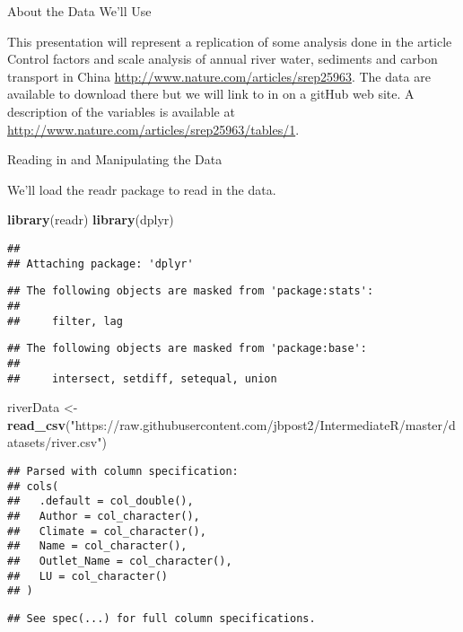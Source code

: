\documentclass[]{article}
\newenvironment{Shaded}{\begin{snugshade}}{\end{snugshade}}
\newcommand{\KeywordTok}[1]{\textcolor[rgb]{0.13,0.29,0.53}{\textbf{#1}}}
\newcommand{\StringTok}[1]{\textcolor[rgb]{0.31,0.60,0.02}{#1}}
\newcommand{\NormalTok}[1]{#1}
\begin{document}
About the Data We'll Use

This presentation will represent a replication of some analysis done in
the article Control factors and scale analysis of annual river water,
sediments and carbon transport in China
\url{http://www.nature.com/articles/srep25963}. The data are available
to download there but we will link to in on a gitHub web site. A
description of the variables is available at
\url{http://www.nature.com/articles/srep25963/tables/1}.

Reading in and Manipulating the Data

We'll load the readr package to read in the data.

\begin{Shaded}
\begin{Highlighting}[]
\KeywordTok{library}\NormalTok{(readr)}
\KeywordTok{library}\NormalTok{(dplyr)}
\end{Highlighting}
\end{Shaded}

\begin{verbatim}
## 
## Attaching package: 'dplyr'
\end{verbatim}

\begin{verbatim}
## The following objects are masked from 'package:stats':
## 
##     filter, lag
\end{verbatim}

\begin{verbatim}
## The following objects are masked from 'package:base':
## 
##     intersect, setdiff, setequal, union
\end{verbatim}

\begin{Shaded}
\begin{Highlighting}[]
\NormalTok{riverData <-}\StringTok{ }\KeywordTok{read_csv}\NormalTok{(}\StringTok{"https://raw.githubusercontent.com/jbpost2/IntermediateR/master/datasets/river.csv"}\NormalTok{)}
\end{Highlighting}
\end{Shaded}

\begin{verbatim}
## Parsed with column specification:
## cols(
##   .default = col_double(),
##   Author = col_character(),
##   Climate = col_character(),
##   Name = col_character(),
##   Outlet_Name = col_character(),
##   LU = col_character()
## )
\end{verbatim}

\begin{verbatim}
## See spec(...) for full column specifications.
\end{verbatim}
\end{document}
